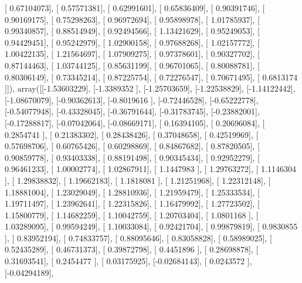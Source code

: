 \documentclass{article}
\begin{document}
       [ 0.67104073],
       [ 0.57571381],
       [ 0.62991601],
       [ 0.65836409],
       [ 0.90391746],
       [ 0.90169175],
       [ 0.75298263],
       [ 0.96972694],
       [ 0.95898978],
       [ 1.01785937],
       [ 0.99340857],
       [ 0.88514949],
       [ 0.92494566],
       [ 1.13421629],
       [ 0.95249053],
       [ 0.94429451],
       [ 0.95242979],
       [ 1.02900158],
       [ 0.97688268],
       [ 1.02157772],
       [ 1.00422135],
       [ 1.21564697],
       [ 1.07909275],
       [ 0.97378601],
       [ 0.90327702],
       [ 0.87144463],
       [ 1.03744125],
       [ 0.85631199],
       [ 0.96701065],
       [ 0.80088781],
       [ 0.80306149],
       [ 0.73345214],
       [ 0.87225754],
       [ 0.72276547],
       [ 0.70671495],
       [ 0.6813174 ]]), array([[-1.53603229],
       [-1.3389352 ],
       [-1.25703659],
       [-1.22538829],
       [-1.14122442],
       [-1.08670079],
       [-0.90362613],
       [-0.8019616 ],
       [-0.72446528],
       [-0.65222778],
       [-0.54077948],
       [-0.43328045],
       [-0.36791644],
       [-0.31783745],
       [-0.23882001],
       [-0.17288817],
       [-0.07042064],
       [-0.08669171],
       [ 0.16394105],
       [ 0.20696084],
       [ 0.2854741 ],
       [ 0.21383302],
       [ 0.28438426],
       [ 0.37048658],
       [ 0.42519969],
       [ 0.57698706],
       [ 0.60765426],
       [ 0.60298869],
       [ 0.84867682],
       [ 0.87820505],
       [ 0.90859778],
       [ 0.93403338],
       [ 0.88191498],
       [ 0.90345434],
       [ 0.92952279],
       [ 0.96461233],
       [ 1.00002774],
       [ 1.02867911],
       [ 1.1447983 ],
       [ 1.29763272],
       [ 1.1146304 ],
       [ 1.29838832],
       [ 1.19662183],
       [ 1.1818081 ],
       [ 1.21251968],
       [ 1.22312148],
       [ 1.18881004],
       [ 1.23029049],
       [ 1.28810936],
       [ 1.21959479],
       [ 1.25333534],
       [ 1.19711497],
       [ 1.23962641],
       [ 1.22315826],
       [ 1.16479992],
       [ 1.27723502],
       [ 1.15800779],
       [ 1.14682259],
       [ 1.10042759],
       [ 1.20703404],
       [ 1.0801168 ],
       [ 1.03289095],
       [ 0.99594249],
       [ 1.10033084],
       [ 0.92421704],
       [ 0.99879819],
       [ 0.9830855 ],
       [ 0.83952194],
       [ 0.74833757],
       [ 0.88095646],
       [ 0.83058828],
       [ 0.58989025],
       [ 0.52435289],
       [ 0.46731373],
       [ 0.39872798],
       [ 0.4451896 ],
       [ 0.28698878],
       [ 0.31693541],
       [ 0.2454477 ],
       [ 0.03175925],
       [-0.02684143],
       [ 0.0243572 ],
       [-0.04294189],
\end{document}
